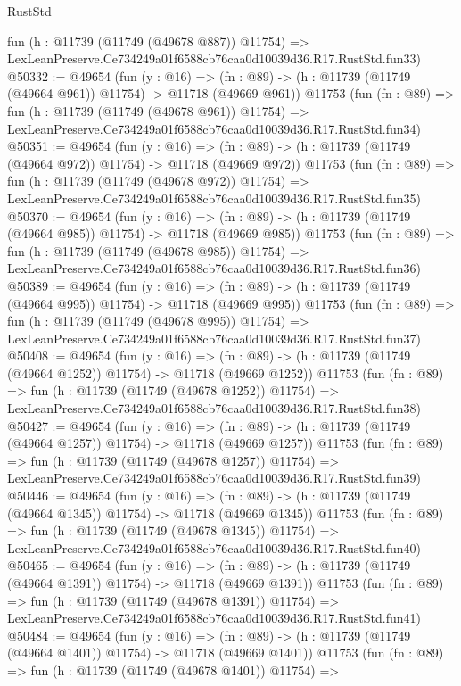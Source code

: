 \begin{lexlean}{RustStd}
\begin{coremodule}
    fun (h : @11739 (@11749 (@49678 @887)) @11754) =>
    LexLeanPreserve.Ce734249a01f6588cb76caa0d10039d36.R17.RustStd.fun33)
@50332 := @49654
    (fun (y : @16) =>
    (fn : @89) -> (h : @11739 (@11749 (@49664 @961)) @11754) -> @11718 (@49669 @961))
    @11753
    (fun (fn : @89) =>
    fun (h : @11739 (@11749 (@49678 @961)) @11754) =>
    LexLeanPreserve.Ce734249a01f6588cb76caa0d10039d36.R17.RustStd.fun34)
@50351 := @49654
    (fun (y : @16) =>
    (fn : @89) -> (h : @11739 (@11749 (@49664 @972)) @11754) -> @11718 (@49669 @972))
    @11753
    (fun (fn : @89) =>
    fun (h : @11739 (@11749 (@49678 @972)) @11754) =>
    LexLeanPreserve.Ce734249a01f6588cb76caa0d10039d36.R17.RustStd.fun35)
@50370 := @49654
    (fun (y : @16) =>
    (fn : @89) -> (h : @11739 (@11749 (@49664 @985)) @11754) -> @11718 (@49669 @985))
    @11753
    (fun (fn : @89) =>
    fun (h : @11739 (@11749 (@49678 @985)) @11754) =>
    LexLeanPreserve.Ce734249a01f6588cb76caa0d10039d36.R17.RustStd.fun36)
@50389 := @49654
    (fun (y : @16) =>
    (fn : @89) -> (h : @11739 (@11749 (@49664 @995)) @11754) -> @11718 (@49669 @995))
    @11753
    (fun (fn : @89) =>
    fun (h : @11739 (@11749 (@49678 @995)) @11754) =>
    LexLeanPreserve.Ce734249a01f6588cb76caa0d10039d36.R17.RustStd.fun37)
@50408 := @49654
    (fun (y : @16) =>
    (fn : @89) -> (h : @11739 (@11749 (@49664 @1252)) @11754) -> @11718 (@49669 @1252))
    @11753
    (fun (fn : @89) =>
    fun (h : @11739 (@11749 (@49678 @1252)) @11754) =>
    LexLeanPreserve.Ce734249a01f6588cb76caa0d10039d36.R17.RustStd.fun38)
@50427 := @49654
    (fun (y : @16) =>
    (fn : @89) -> (h : @11739 (@11749 (@49664 @1257)) @11754) -> @11718 (@49669 @1257))
    @11753
    (fun (fn : @89) =>
    fun (h : @11739 (@11749 (@49678 @1257)) @11754) =>
    LexLeanPreserve.Ce734249a01f6588cb76caa0d10039d36.R17.RustStd.fun39)
@50446 := @49654
    (fun (y : @16) =>
    (fn : @89) -> (h : @11739 (@11749 (@49664 @1345)) @11754) -> @11718 (@49669 @1345))
    @11753
    (fun (fn : @89) =>
    fun (h : @11739 (@11749 (@49678 @1345)) @11754) =>
    LexLeanPreserve.Ce734249a01f6588cb76caa0d10039d36.R17.RustStd.fun40)
@50465 := @49654
    (fun (y : @16) =>
    (fn : @89) -> (h : @11739 (@11749 (@49664 @1391)) @11754) -> @11718 (@49669 @1391))
    @11753
    (fun (fn : @89) =>
    fun (h : @11739 (@11749 (@49678 @1391)) @11754) =>
    LexLeanPreserve.Ce734249a01f6588cb76caa0d10039d36.R17.RustStd.fun41)
@50484 := @49654
    (fun (y : @16) =>
    (fn : @89) -> (h : @11739 (@11749 (@49664 @1401)) @11754) -> @11718 (@49669 @1401))
    @11753
    (fun (fn : @89) =>
    fun (h : @11739 (@11749 (@49678 @1401)) @11754) =>

\end{coremodule}
\end{lexlean}
